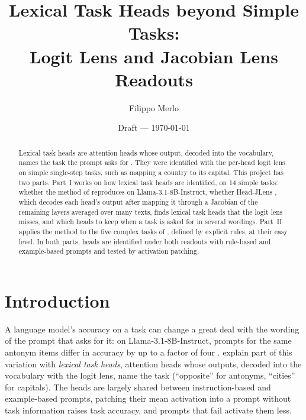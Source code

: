 \documentclass[11pt,a4paper]{article}
\title{Lexical Task Heads beyond Simple Tasks:\\ Logit Lens and Jacobian Lens Readouts}
\author{Filippo Merlo}
\date{Draft --- \today}
\begin{document}
\maketitle

\begin{abstract}
\label{sec:abstract}
Lexical task heads are attention heads whose output, decoded into the vocabulary, names the task the prompt asks for \citep{yang2026shared}. They were identified with the per-head logit lens on simple single-step tasks, such as mapping a country to its capital. This project has two parts. Part~I works on how lexical task heads are identified, on 14 simple tasks: whether the method of \citet{yang2026shared} reproduces on Llama-3.1-8B-Instruct, whether Head-JLens \citep{merlo2026headjlens}, which decodes each head's output after mapping it through a Jacobian of the remaining layers averaged over many texts, finds lexical task heads that the logit lens misses, and which heads to keep when a task is asked for in several wordings. Part~II applies the method to the five complex tasks of \citet{fu2026rules}, defined by explicit rules, at their easy level. In both parts, heads are identified under both readouts with rule-based and example-based prompts and tested by activation patching.
\end{abstract}

\section{Introduction}\label{sec:intro}
A language model's accuracy on a task can change a great deal with the wording of the prompt that asks for it: on Llama-3.1-8B-Instruct, prompts for the same antonym items differ in accuracy by up to a factor of four \citep[Fig.~1]{yang2026shared}. \citet{yang2026shared} explain part of this variation with \emph{lexical task heads}, attention heads whose outputs, decoded into the vocabulary with the logit lens, name the task (``opposite'' for antonyms, ``cities'' for capitals). The heads are largely shared between instruction-based and example-based prompts, patching their mean activation into a prompt without task information raises task accuracy, and prompts that fail activate them less.
\end{document}
